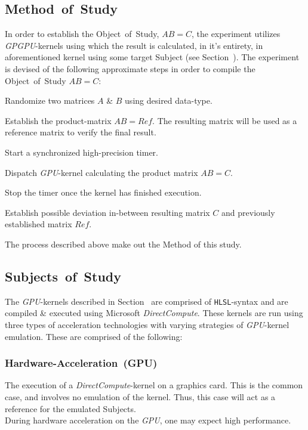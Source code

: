 \documentclass[a4paper,twocolumn,10pt]{article}
\begin{document}
\subsection{Method~of~Study}
\label{sec:contribution:methodofstudy}
In order to establish the Object~of~Study, $AB=C$, the experiment utilizes \textit{GPGPU}-kernels using which the result is calculated, in it’s entirety, in aforementioned kernel using some target Subject (see Section~). The experiment is devised of the following approximate steps in order to compile the Object~of~Study $AB=C$:
\begin{enumerate*}
	\item Randomize two matrices $A$ \& $B$ using desired data-type.
	\item Establish the product-matrix $AB=Ref$. The resulting matrix will be used as a reference matrix to verify the final result.
	\item Start a synchronized high-precision timer.
	\item Dispatch \textit{GPU}-kernel calculating the product matrix $AB=C$.
	\item Stop the timer once the kernel has finished execution.
	\item Establish possible deviation in-between resulting matrix $C$ and previously established matrix $Ref$.
\end{enumerate*}
The process described above make out the Method of this study.

\subsection{Subjects~of~Study}
\label{sec:contribution:subjectsofstudy}
The \textit{GPU}-kernels described in Section~ are comprised of \texttt{HLSL}-syntax and are compiled \& executed using Microsoft \textit{DirectCompute}. These kernels are run using three types of acceleration technologies with varying strategies of \textit{GPU}-kernel emulation. These are comprised of the following:
\subsubsection{Hardware-Acceleration~(GPU)}
The execution of a \textit{DirectCompute}-kernel on a graphics card. This is the common case, and involves no emulation of the kernel. Thus, this case will act as a reference for the emulated Subjects.\\
During hardware acceleration on the \textit{GPU}, one may expect high performance.
\end{document}
